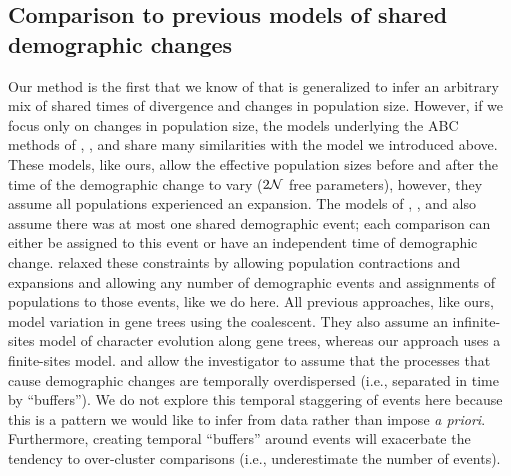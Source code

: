 \subsection{Comparison to previous models of shared demographic changes}

Our method is the first that we know of that is generalized to infer an
arbitrary mix of shared times of divergence and changes in population size.
However, if we focus only on changes in population size, the models underlying
the ABC methods of
\citet{Chan2014}, \citet{Xue2015}, and \citet{Gehara2017}
share many similarities with the model we introduced above.
These models, like ours, allow the effective population sizes before and after
the time of the demographic change to vary ($2\mathcal{N}$ free parameters),
however, they assume all populations experienced an expansion.
The models of \citet{Chan2014}, \citet{Xue2015}, and \citet{Gehara2017}
also assume there was at most one shared demographic event;
each comparison can either be assigned to this event or have an independent
time of demographic change.
\citet{Xue2017} relaxed these constraints by allowing population contractions
and expansions and allowing any number of demographic events and assignments of
populations to those events, like we do here.
All previous approaches, like ours, model variation in gene trees using the
coalescent.
They also assume an infinite-sites model of character evolution along gene
trees, whereas our approach uses a finite-sites model.
\citet{Gehara2017} and \citet{Xue2017}
allow the investigator to assume that the processes that cause demographic
changes are temporally overdispersed (i.e., separated in time by ``buffers'').
We do not explore this temporal staggering of events here
because this is a pattern we would like to infer from data rather than impose
\emph{a priori}.
Furthermore, creating temporal ``buffers'' around events will exacerbate the
tendency to over-cluster comparisons (i.e., underestimate the number of
events).

